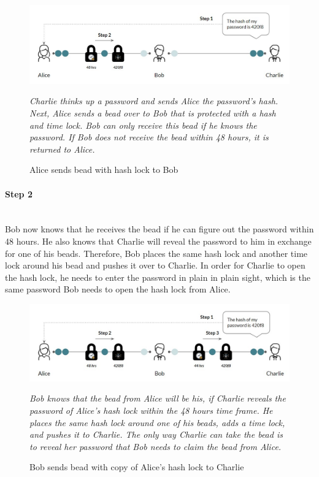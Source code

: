 \documentclass[a4paper, 12pt]{report}
\begin{document}
\begin{figure}[H]
	\includegraphics[width=\textwidth]{11_HTLC_Step1}
	\caption{Alice sends bead with hash lock to Bob}
	\medskip
	\small \textit{Charlie thinks up a password and sends Alice the password’s hash. Next, Alice sends a bead over to Bob that is protected with a hash and time lock. Bob can only receive this bead if he knows the password. If Bob does not receive the bead within 48 hours, it is returned to Alice.}
	\label{fig:11_HTLC_Step1}
\end{figure}

\paragraph{Step 2} \hspace{0pt} \\
Bob now knows that he receives the bead if he can figure out the password within 48 hours. He also knows that Charlie will reveal the password to him in exchange for one of his beads. Therefore, Bob places the same hash lock and another time lock around his bead and pushes it over to Charlie. In order for Charlie to open the hash lock, he needs to enter the password in plain in plain sight, which is the same password Bob needs to open the hash lock from Alice.

\begin{figure}[H]
	\includegraphics[width=\textwidth]{12_HTLC_Step2}
	\caption{Bob sends bead with copy of Alice's hash lock to Charlie}
	\medskip
	\small \textit{Bob knows that the bead from Alice will be his, if Charlie reveals the password of Alice's hash lock within the 48 hours time frame. He places the same hash lock around one of his beads, adds a time lock, and pushes it to Charlie. The only way Charlie can take the bead is to reveal her password that Bob needs to claim the bead from Alice.}
	\label{fig:12_HTLC_Step2}
\end{figure} 
\end{document}
